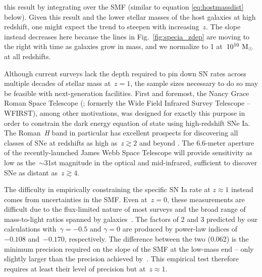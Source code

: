 \documentclass[ms.tex]{subfiles}
\begin{document}
this result by integrating over the SMF (similar to equation
\ref{eq:hostmassdist} below).
Given this result and the lower stellar masses of the host galaxies at high
redshift, one might expect the trend to steepen with increasing~$z$.
The slope instead decreases here because the lines in Fig.~\ref{fig:specia_zdep}
are moving to the right with time as galaxies grow in mass, and we normalize to
1 at~$10^{10}~\text{M}_\odot$ at all redshifts.
\par
Although current surveys lack the depth required to pin down SN rates across
multiple decades of stellar mass at~$z = 1$, the sample sizes necessary to do
so may be feasible with next-generation facilities.
First and foremost, the Nancy Grace Roman Space Telescope (\citealp{Spergel2013,
Spergel2015}; formerly the Wide Field Infrared Survey Telescope -- WFIRST),
among other motivations, was designed for exactly this purpose in order to
constrain the dark energy equation of state using high-redshift SNe Ia.
The Roman~\textit{H} band in particular has excellent prospects for discovering
all classes of SNe at redshifts as high as~$z \gtrsim 2$ and beyond
\citep{Petrushevska2016}.
The 6.6-meter aperture of the recently-launched James Webb Space Telescope
\citep[JWST;][]{Gardner2006} will provide sensitivity as low as the~$\sim$31st
magnitude in the optical and mid-infrared, sufficient to discover SNe as
distant as~$z \gtrsim 4$.
\par
The difficulty in empirically constraining the specific SN Ia rate at
$z \approx 1$ instead comes from uncertainties in the SMF.
Even at~$z = 0$, these measurements are difficult due to the flux-limited
nature of most surveys and the broad range of mass-to-light ratios spanned by
galaxies~\citep[see discussion in][]{Weigel2016}.
The factors of 2 and 3 predicted by our calculations with~$\gamma = -0.5$ and
$\gamma = 0$ are produced by power-law indices of~$-0.108$ and~$-0.170$,
respectively.
The difference between the two (0.062) is the minimum precision required on the
slope of the SMF at the low-mass end -- only slightly larger than the precision
achieved by~\citet[][$\pm 0.05$, see their Fig. 13]{Baldry2012}.
This empirical test therefore requires at least their level of precision but
at~$z \approx 1$.
\end{document}
